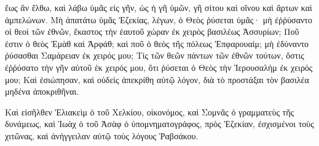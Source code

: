 {ἕως ἂν ἔλθω, καὶ λάβω ὑμᾶς εἰς γῆν, ὡς ἡ γῆ ὑμῶν, γῆ σίτου καὶ οἴνου καὶ ἄρτων καὶ ἀμπελώνων.
Μὴ ἀπατάτω ὑμᾶς Ἐζεκίας, λέγων, ὁ Θεὸς ῥύσεται ὑμᾶς· μὴ ἐῤῥύσαντο οἱ θεοὶ τῶν ἐθνῶν, ἕκαστος τὴν ἑαυτοῦ χώραν ἐκ χειρὸς βασιλέως Ἀσσυρίων;
Ποῦ ἐστιν ὁ θεὸς Ἐμὰθ καὶ Ἀρφάθ; καὶ ποῦ ὁ θεὸς τῆς πόλεως Ἐπφαρουαίμ; μὴ ἐδύναντο ῥύσασθαι Σαμάρειαν ἐκ χειρός μου;
Τίς τῶν θεῶν πάντων τῶν ἐθνῶν τούτων, ὅστις ἐῤῥύσατο τὴν γῆν αὐτοῦ ἐκ χειρός μου, ὅτι ῥύσεται ὁ Θεὸς τὴν Ἱερουσαλὴμ ἐκ χειρός μου;
Καὶ ἐσιώπησαν, καὶ οὐδεὶς ἀπεκρίθη αὐτῷ λόγον, διὰ τὸ προστάξαι τὸν βασιλέα μηδένα ἀποκριθῆναι.
\par }{\PP {}Καὶ εἰσῆλθεν Ἑλιακεὶμ ὁ τοῦ Χελκίου, οἰκονόμος, καὶ Σομνᾶς ὁ γραμματεὺς τῆς δυνάμεως, καὶ Ἰωὰχ ὁ τοῦ Ἀσὰφ ὁ ὑπομνηματογράφος, πρὸς Ἐζεκίαν, ἐσχισμένοι τοὺς χιτῶνας, καὶ ἀνήγγειλαν αὐτῷ τοὺς λόγους Ῥαβσάκου.

}
